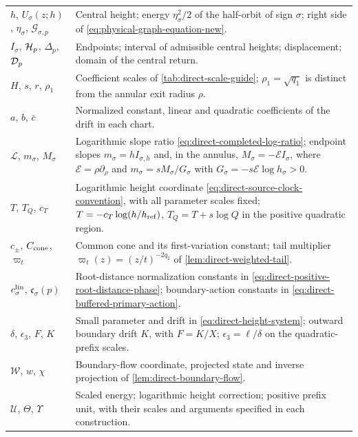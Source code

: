 \begin{longtable}{@{}>{\raggedright\arraybackslash}p{}
                >{\raggedright\arraybackslash}p{}@{}}
\(h\), \(U_\sigma(z;h)\), \(\eta_\sigma\), \(\mathcal G_{\sigma,p}\)
  & Central height; energy \(\eta_\sigma^2/2\) of the half-orbit of sign
    \(\sigma\); right side of \eqref{eq:physical-graph-equation-new}.\\
\(I_\sigma\), \(\mathcal H_p\), \(\Delta_p\), \(\mathcal D_p\)
  & Endpoints; interval of admissible central heights; displacement;
    domain of the central return.\\
\(H\), \(s\), \(r\), \(\rho_1\)
  & Coefficient scales of \cref{tab:direct-scale-guide};
    \(\rho_1=\sqrt{q_1}\) is distinct from the annular exit radius
    \(\rho\).\\
\(a\), \(b\), \(\bar c\)
  & Normalized constant, linear and quadratic coefficients of the drift
    in each chart.\\
\(\mathcal L\), \(m_\sigma\), \(M_\sigma\)
  & Logarithmic slope ratio \eqref{eq:direct-completed-log-ratio};
    endpoint slopes \(m_\sigma=hI_{\sigma,h}\) and, in the annulus,
    \(M_\sigma=-\mathcal E I_\sigma\), where \(\mathcal E=\rho\partial_\rho\)
    and \(m_\sigma=sM_\sigma/G_\sigma\) with
    \(G_\sigma=-s\mathcal E\log h_\sigma>0\).\\
\(T\), \(T_Q\), \(c_T\)
  & Logarithmic height coordinate
    \eqref{eq:direct-source-clock-convention}, with all parameter scales
    fixed; \(T=-c_T\log(h/h_{\rm ref})\), \(T_Q=T+s\log Q\) in the positive
    quadratic region.\\
\(c_\pm\), \(C_{\rm cone}\), \(\varpi_t\)
  & Common cone and its first-variation constant; tail multiplier
    \(\varpi_t(z)=(z/t)^{-2q_2}\) of \cref{lem:direct-weighted-tail}.\\
\(c_\sigma^{\rm lin}\), \(\mathfrak c_\sigma(p)\)
  & Root-distance normalization constants in
    \eqref{eq:direct-positive-root-distance-phase}; boundary-action
    constants in \eqref{eq:direct-buffered-primary-action}.\\
\(\delta\), \(\epsilon_3\), \(F\), \(K\)
  & Small parameter and drift in \eqref{eq:direct-height-system}; outward
    boundary drift \(K\), with \(F=K/X\);
    \(\epsilon_3=\ell/\delta\) on the quadratic-prefix scales.\\
\(\mathcal W\), \(w\), \(\chi\)
  & Boundary-flow coordinate, projected state and inverse projection of
    \cref{lem:direct-boundary-flow}.\\
\(\mathcal U\), \(\Theta\), \(\Upsilon\)
  & Scaled energy; logarithmic height correction; positive prefix unit,
    with their scales and arguments specified in each construction.\\

\end{longtable}

